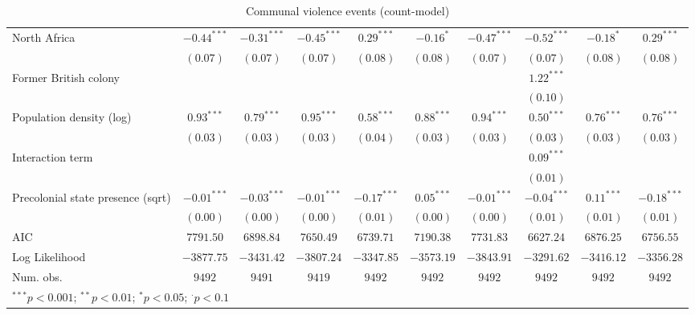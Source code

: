 \begin{sidewaystable}
\begin{center}
{\begin{tabular}{l c c c c c c c c c}
North Africa                          & $-0.44^{***}$ & $-0.31^{***}$ & $-0.45^{***}$ & $0.29^{***}$  & $-0.16^{*}$   & $-0.47^{***}$ & $-0.52^{***}$ & $-0.18^{*}$   & $0.29^{***}$  \\
                                      & $(0.07)$      & $(0.07)$      & $(0.07)$      & $(0.08)$      & $(0.08)$      & $(0.07)$      & $(0.07)$      & $(0.08)$      & $(0.08)$      \\
Former British colony                 &               &               &               &               &               &               & $1.22^{***}$  &               &               \\
                                      &               &               &               &               &               &               & $(0.10)$      &               &               \\
Population density (log)              & $0.93^{***}$  & $0.79^{***}$  & $0.95^{***}$  & $0.58^{***}$  & $0.88^{***}$  & $0.94^{***}$  & $0.50^{***}$  & $0.76^{***}$  & $0.76^{***}$  \\
                                      & $(0.03)$      & $(0.03)$      & $(0.03)$      & $(0.04)$      & $(0.03)$      & $(0.03)$      & $(0.03)$      & $(0.03)$      & $(0.03)$      \\
Interaction term                      &               &               &               &               &               &               & $0.09^{***}$  &               &               \\
                                      &               &               &               &               &               &               & $(0.01)$      &               &               \\
Precolonial state presence (sqrt)     & $-0.01^{***}$ & $-0.03^{***}$ & $-0.01^{***}$ & $-0.17^{***}$ & $0.05^{***}$  & $-0.01^{***}$ & $-0.04^{***}$ & $0.11^{***}$  & $-0.18^{***}$ \\
                                      & $(0.00)$      & $(0.00)$      & $(0.00)$      & $(0.01)$      & $(0.00)$      & $(0.00)$      & $(0.01)$      & $(0.01)$      & $(0.01)$      \\
\midrule
AIC                                   & $7791.50$     & $6898.84$     & $7650.49$     & $6739.71$     & $7190.38$     & $7731.83$     & $6627.24$     & $6876.25$     & $6756.55$     \\
Log Likelihood                        & $-3877.75$    & $-3431.42$    & $-3807.24$    & $-3347.85$    & $-3573.19$    & $-3843.91$    & $-3291.62$    & $-3416.12$    & $-3356.28$    \\
Num. obs.                             & $9492$        & $9491$        & $9419$        & $9492$        & $9492$        & $9492$        & $9492$        & $9492$        & $9492$        \\
\bottomrule
\multicolumn{10}{l}{\scriptsize{$^{***}p<0.001$; $^{**}p<0.01$; $^{*}p<0.05$; $^{\cdot}p<0.1$}}
\end{tabular}
}
\caption{Communal violence events (count-model)}
\label{czorg3}
\end{center}
\end{sidewaystable}
